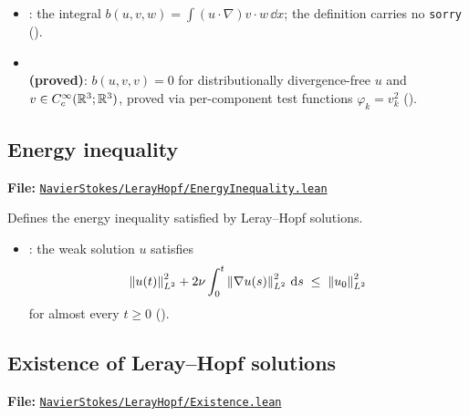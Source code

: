 \begin{itemize}
  \item {}: the integral $b(u,v,w) = \int
    (u\cdot\nabla)v\cdot w\,\dd x$; the definition carries no \texttt{sorry}
    ().
  \item {}\\
    \textbf{(proved)}: $b(u,v,v) = 0$ for distributionally divergence-free $u$
    and $v \in C^{\infty}_{c}(\mathbb{R}^{3};\mathbb{R}^{3})$, proved via per-component test
    functions $\varphi_{k} = v_{k}^{2}$ ().
\end{itemize}

\subsection{Energy inequality}\label{sec:lean-ch2-energy}

\textbf{File:}
\href{https://github.com/alejandro-soto-franco/navier-stokes/blob/master/lean/NavierStokes/LerayHopf/EnergyInequality.lean}%
{\texttt{NavierStokes/LerayHopf/EnergyInequality.lean}}

\medskip\noindent
Defines the energy inequality satisfied by Leray--Hopf solutions.

\begin{itemize}
  \item {}: the weak solution $u$
    satisfies
    \[
      \left\lVert u(t) \right\rVert_{L^{2}}^{2}
      + 2\nu\int_{0}^{t}\left\lVert \nabla u(s) \right\rVert_{L^{2}}^{2}\,\mathrm{d} s
      \;\le\; \left\lVert u_{0} \right\rVert_{L^{2}}^{2}
    \]
    for almost every $t \ge 0$ ().
\end{itemize}

\subsection{Existence of Leray--Hopf solutions}\label{sec:lean-ch2-existence}

\textbf{File:}
\href{https://github.com/alejandro-soto-franco/navier-stokes/blob/master/lean/NavierStokes/LerayHopf/Existence.lean}%
{\texttt{NavierStokes/LerayHopf/Existence.lean}}

